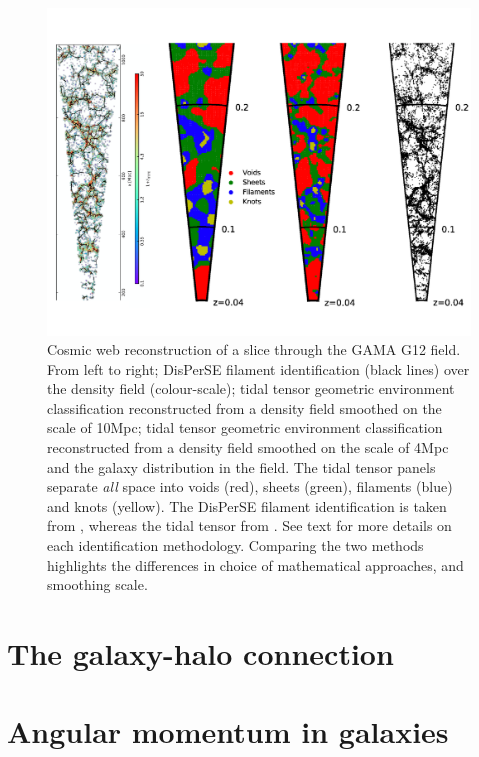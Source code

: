 \begin{figure}
    \centering
	\includegraphics[width=\linewidth]{thesis/latex/introduction/disperse_tt_comparison_gama.pdf}
    \caption{Cosmic web reconstruction of a slice through the GAMA G12 field. From left to right; DisPerSE filament identification (black lines) over the density field (colour-scale); tidal tensor geometric environment classification reconstructed from a density field smoothed on the scale of 10Mpc; tidal tensor geometric environment classification reconstructed from a density field smoothed on the scale of 4Mpc and the galaxy distribution in the field. The tidal tensor panels separate \textit{all} space into voids (red), sheets (green), filaments (blue) and knots (yellow). The DisPerSE filament identification is taken from \citet{kraljic2018}, whereas the tidal tensor from \citet{eardley2015}. See text for more details on each identification methodology. Comparing the two methods highlights the differences in choice of mathematical approaches, and smoothing scale.}
    \label{fig:disperse_tt_comparison}
\end{figure}

\section{The galaxy-halo connection}

\section{Angular momentum in galaxies} \label{sec:ang_mom_intro}
